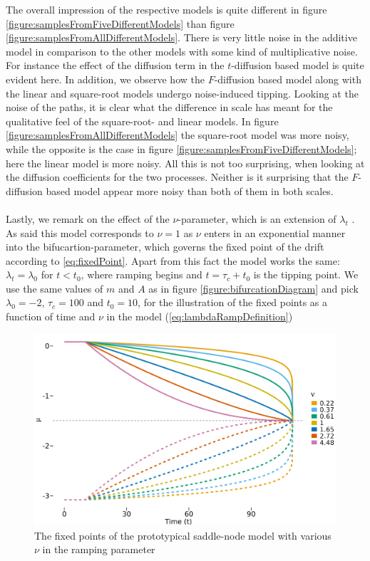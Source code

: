 The overall impression of the respective models is quite different in figure \ref{figure:samplesFromFiveDifferentModels} than figure \ref{figure:samplesFromAllDifferentModels}. There is very little noise in the additive model in comparison to the other models with some kind of multiplicative noise. For instance the effect of the diffusion term in the $t$-diffusion based model is quite evident here. In addition, we observe how the $F$-diffusion based model along with the linear and square-root models undergo noise-induced tipping. Looking at the noise of the paths, it is clear what the difference in scale has meant for the qualitative feel of the square-root- and linear models. In figure \ref{figure:samplesFromAllDifferentModels} the square-root model was more noisy, while the opposite is the case in figure \ref{figure:samplesFromFiveDifferentModels}; here the linear model is more noisy. All this is not too surprising, when looking at the diffusion coefficients for the two processes. Neither is it surprising that the $F$-diffusion based model appear more noisy than both of them in both scales.\\\\
Lastly, we remark on the effect of the $\nu$-parameter, which is an extension of $\lambda_t$ \cite[equation (2)]{Ditlevsen2023}. As said this model corresponds to $\nu = 1$ as $\nu$ enters in an exponential manner into the bifucartion-parameter, which governs the fixed point of the drift according to \ref{eq:fixedPoint}. Apart from this fact the model works the same: $\lambda_t = \lambda_0$ for $t<t_0$, where ramping begins and $t=\tau_c + t_0$ is the tipping point. We use the same values of $m$ and $A$ as in figure \ref{figure:bifurcationDiagram} and pick $\lambda_0 = -2$, $\tau_c = 100$ and $t_0 = 10$, for the illustration of the fixed points as a function of time and $\nu$ in the model (\ref{eq:lambdaRampDefinition})
\begin{figure}[h!]
    \begin{center}
        \includegraphics[scale = .1]{figures/nu_plot.jpeg}
        \caption{The fixed points of the prototypical saddle-node model with various $\nu$ in the ramping parameter}
        \label{figure:nu_plot}    
    \end{center}
\end{figure}\\
